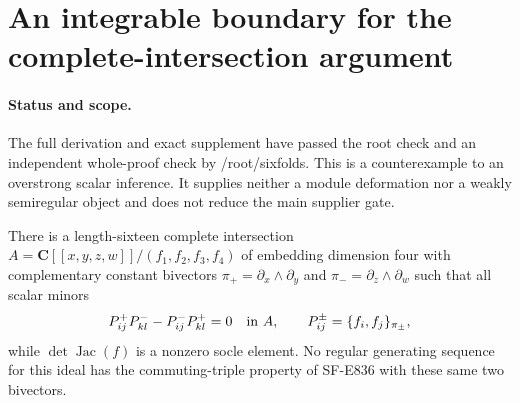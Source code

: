 \section{An integrable boundary for the complete-intersection argument}
\label{sec:ci-cross-minor-boundary}

\paragraph{Status and scope.}
The full derivation and exact supplement have passed the root check and
an independent whole-proof check by /root/sixfolds. This is a
counterexample to an overstrong scalar inference. It supplies neither a
module deformation nor a weakly semiregular object and does not reduce
the main supplier gate.

\begin{proposition}
\label{HD-CI-B1}
There is a length-sixteen complete intersection
$A=\mathbf C[[x,y,z,w]]/(f_1,f_2,f_3,f_4)$ of embedding dimension four
with complementary constant bivectors
$\pi_+=\partial_x\wedge\partial_y$ and
$\pi_-=\partial_z\wedge\partial_w$ such that all scalar minors
\[
 P^+_{ij}P^-_{kl}-P^-_{ij}P^+_{kl}=0\quad\hbox{in }A,
 \qquad P^{\pm}_{ij}=\{f_i,f_j\}_{\pi_\pm},
\]
while $\det\operatorname{Jac}(f)$ is a nonzero socle element.
No regular generating sequence for this ideal has the commuting-triple
property of SF-E836 with these same two bivectors.
\end{proposition}

